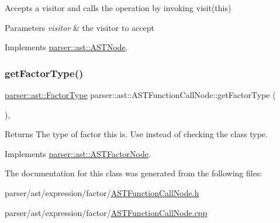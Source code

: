 Accepts a visitor and calls the operation by invoking {\ttfamily visit(this)} 
\begin{DoxyParams}{Parameters}
{\em visitor} & the visitor to accept \\
\hline
\end{DoxyParams}


Implements \hyperlink{classparser_1_1ast_1_1ASTNode_a3ff84fdfdbbc5c39b70b4d04c22e7dc3}{parser\+::ast\+::\+A\+S\+T\+Node}.

\mbox{\label{classparser_1_1ast_1_1ASTFunctionCallNode_a1c40c8e98284fd4389b34da161e8b39a}} 
\subsubsection{\texorpdfstring{get\+Factor\+Type()}{getFactorType()}}
{\footnotesize\ttfamily \hyperlink{ASTFactorNode_8h_afbe2fcc03ef15b74a0c1ed1cda7ab0e8}{parser\+::ast\+::\+Factor\+Type} parser\+::ast\+::\+A\+S\+T\+Function\+Call\+Node\+::get\+Factor\+Type (\begin{DoxyParamCaption}{ }\end{DoxyParamCaption})\hspace{0.3cm}{\ttfamily [override]}, {\ttfamily [virtual]}}

\begin{DoxyReturn}{Returns}
The type of factor this is. Use instead of checking the class type. 
\end{DoxyReturn}


Implements \hyperlink{classparser_1_1ast_1_1ASTFactorNode_a13eea7f949c0055dea0a9d7b715f16a8}{parser\+::ast\+::\+A\+S\+T\+Factor\+Node}.



The documentation for this class was generated from the following files\+:\begin{DoxyCompactItemize}
\item 
parser/ast/expression/factor/\hyperlink{ASTFunctionCallNode_8h}{A\+S\+T\+Function\+Call\+Node.\+h}\item 
parser/ast/expression/factor/\hyperlink{ASTFunctionCallNode_8cpp}{A\+S\+T\+Function\+Call\+Node.\+cpp}\end{DoxyCompactItemize}
